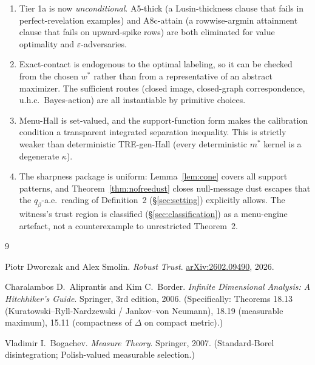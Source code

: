 \documentclass[11pt]{article}
\theoremstyle{definition}
\theoremstyle{remark}
\newcommand{\eps}{\varepsilon}
\begin{document}
\begin{enumerate}[leftmargin=2em]
\item Tier 1a is now \emph{unconditional}. A5-thick (a Lusin-thickness
clause that fails in perfect-revelation examples) and A8c-attain (a
rowwise-argmin attainment clause that fails on upward-spike rows) are
both eliminated for value optimality and $\eps$-adversaries.
\item Exact-contact is endogenous to the optimal labeling, so it can
be checked from the chosen $w^*$ rather than from a representative
of an abstract maximizer. The sufficient routes (closed image,
closed-graph correspondence, u.h.c.\ Bayes-action) are all
instantiable by primitive choices.
\item Menu-Hall is set-valued, and the support-function form makes
the calibration condition a transparent integrated separation
inequality. This is strictly weaker than deterministic TRE-gen-Hall
(every deterministic $m^*$ kernel is a degenerate $\kappa$).
\item The sharpness package is uniform: Lemma~\ref{lem:cone} covers
all support patterns, and Theorem~\ref{thm:nofreedust} closes
null-message dust escapes that the $q_\beta$-a.e.\ reading of
Definition~2 (\S\ref{sec:setting}) explicitly allows. The witness's
trust region is classified (\S\ref{sec:classification}) as a
menu-engine artefact, not a counterexample to unrestricted
Theorem~2.
\end{enumerate}

\begin{thebibliography}{9}

Piotr Dworczak and Alex Smolin.
\emph{Robust Trust}.
\href{https://arxiv.org/abs/2602.09490}{arXiv:2602.09490}, 2026.

Charalambos D.\ Aliprantis and Kim C.\ Border.
\emph{Infinite Dimensional Analysis: A Hitchhiker's Guide}.
Springer, 3rd edition, 2006.
(Specifically: Theorems 18.13 (Kuratowski--Ryll-Nardzewski /
Jankov--von Neumann), 18.19 (measurable maximum), 15.11 (compactness
of $\Delta$ on compact metric).)

Vladimir I.\ Bogachev.
\emph{Measure Theory}.
Springer, 2007.
(Standard-Borel disintegration; Polish-valued measurable selection.)

\end{thebibliography}
\end{document}
